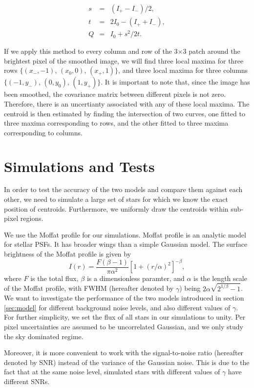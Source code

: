 \documentclass[12pt, preprint]{aastex}
\newcommand{\beq}{\begin{equation}}
\newcommand{\eeq}{\end{equation}}
\begin{document}
\begin{eqnarray}
s&=&(I_{+}-I_{-})/2, \\
t &=&2I_{0} - (I_{+}+I_{-}), \\
Q &=& I_{0} +s^{2}/2t.
\label{def}
\end{eqnarray}

If we apply this method to every column and row of the 3$\times$3 patch around the brightest pixel of the smoothed image, we will find three local maxima for three rows $\{(x_{-},-1)$, $(x_{0},0)$, $(x_{+},1)\}$, and three local maxima for three columns $\{(-1,y_{-})$, $(0,y_{0})$, $(1,y_{+})\}$. It is important to note that, since the image has been smoothed, the covariance matrix between different pixels is not zero. Therefore, there is an uncertianty associated with any of these local maxima. The centroid is then estimated by finding the intersection of two curves, one fitted to three maxima corresponding to rows, and the other fitted to three maxima corresponding to columns.
\section{Simulations and Tests}\label{sec:data}

In order to test the accuracy of the two models and compare them against each other, we need to simulate a large set of stars for which we know the exact position of centroids. Furthermore, we uniformly draw the centroids within sub-pixel regions. 

We use the Moffat profile \citep{moffat} for our simulations. Moffat profile is an analytic model for stellar PSFs. It has broader wings than a simple Gaussian model. The surface brightness of the Moffat profile is given by
\beq
I(r) = \frac{F(\beta -1)}{\pi \alpha^{2}}[1+(r/\alpha)^{2}]^{-\beta},
\label{mof}
\eeq
where $F$ is the total flux, $\beta$ is a dimensionless paramter, and $\alpha$ is the length scale of the Moffat profile, with FWHM (hereafter denoted by $\gamma$) being $2\alpha\sqrt{2^{1/\beta}-1}$. 
We want to investigate the performance of the two models introduced in section \ref{sec:model} for different background noise levels, and also different values of $\gamma$. For further simplicity, we set the flux of all stars in our simulations to unity. Per pixel uncertainties are assumed to be uncorrelated Gaussian, and we only study the sky dominated regime.

Moreover, it is more convenient to work with the signal-to-noise ratio (hereafter denoted by SNR) instead of the variance of the Gaussian noise. This is due to the fact that at the same noise level, simulated stars with different values of $\gamma$ have different SNRs. 
\end{document}
